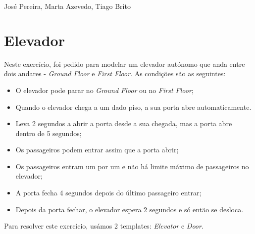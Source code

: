 \documentclass[12pt]{article} %
\begin{document}
José Pereira, Marta Azevedo, Tiago Brito

\section{Elevador} %

Neste exercício, foi pedido para modelar um elevador autónomo que anda entre dois andares - {\it{Ground Floor}} e {\it{First Floor}}. As condições são as seguintes:
\begin{itemize}
\item O elevador pode parar no {\it{Ground Floor}} ou no {\it{First Floor}};
\item Quando o elevador chega a um dado piso, a sua porta abre automaticamente.
\item Leva 2 segundos a abrir a porta desde a sua chegada, mas a porta abre dentro de 5 segundos;
\item Os passageiros podem entrar assim que a porta abrir;
\item Os passageiros entram um por um e não há limite máximo de passageiros no elevador;
\item A porta fecha 4 segundos depois do último passageiro entrar;
\item Depois da porta fechar, o elevador espera 2 segundos e só então se desloca.
\end{itemize}

Para resolver este exercício, usámos 2 templates: {\it{Elevator}} e {\it{Door}}. 
\\
\end{document}
